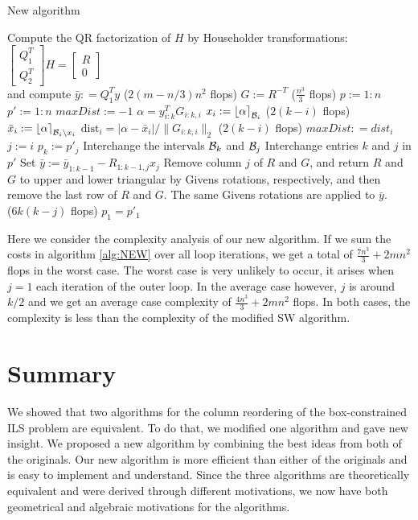 \documentclass[conference]{IEEEtran}
\newcommand{\bsmx}{\left[\begin{smallmatrix}}
\newcommand{\esmx}{\end{smallmatrix}\right]}
\newcommand{\dist}{\mathrm{dist}}
\begin{document}
\begin{algorithm}
\caption{New algorithm}
\label{alg:NEW}
\begin{algorithmic}[1]
\STATE  Compute the QR factorization of $H$ by Householder transformations: 
$\bsmx Q_1^T \\ Q_2^T \esmx H= \bsmx R\\ 0 \esmx$  \\
             and compute  $\bar{y} : = Q_1^Ty$ \hfill ($2(m-n/3)n^2$ flops)
\STATE $G := R^{-T}$ \hfill ($\frac{n^3}{3}$ flops)
\STATE $p := 1:n$
\STATE $p' := 1:n$
	\STATE $maxDist := -1$
	         \STATE $\alpha=y_{i:k}^TG_{i:k,i}$
	         \STATE $x_i := \left \lfloor \alpha \right \rceil_{{\cal B}_i}$ \hfill ($2(k-i)$ flops)
	         \STATE $\bar{x}_i := \left \lfloor \alpha \right \rceil_{{{\cal B}_i}\backslash x_i}$
	         \STATE $\dist_i =|\alpha-\bar{x}_i|/ \| G_{i:k,i} \|_2$ \hfill ($2(k-i)$ flops)
			 	\STATE $maxDist : = dist_i$
			 	\STATE $j:=i$
			 \ENDIF	
	\ENDFOR
	\STATE $p_k := p'_j$
	\STATE Interchange the intervals ${{\cal B}_k}$ and ${{\cal B}_j}$
	\STATE Interchange entries $k$ and $j$ in $p'$
	\STATE Set $\bar{y}:=\bar{y}_{1:k-1} - R_{1:k-1,j}x_j$	
	\STATE Remove column $j$ of $R$ and $G$, and return $R$ and $G$ to upper and lower triangular 
	by Givens rotations, respectively, and then remove the last row of $R$ and $G$. 
	The same Givens rotations are applied to $\bar{y}$. \\  \hfill ($6k(k-j)$ flops)
\ENDFOR
\STATE $p_1 = p'_1$
\end{algorithmic}
\end{algorithm}

Here we consider the complexity analysis of our new algorithm. 
If we sum the costs in algorithm \ref{alg:NEW} over all loop iterations,
we get a total of $\frac{7n^3}{3} + 2mn^2$ flops in the worst case. 
The worst case is very unlikely to occur, it arises when $j=1$ each iteration of the outer loop. In the average case
however, $j$ is around $k/2$ and we get an average case complexity of $\frac{4n^3}{3} + 2mn^2$ flops.
In both cases, the complexity is less than the complexity of the modified SW algorithm. 



\section{Summary}
We showed that two algorithms for the column reordering  of the
box-constrained ILS problem are equivalent. To do that, we modified 
one algorithm and gave new insight.  
We proposed a new algorithm by combining
 the best ideas from both of the originals. Our new algorithm is more
efficient than either of the originals and is easy to implement and understand. 
Since the
three algorithms are theoretically equivalent and were derived through different
motivations, we now have both geometrical and algebraic motivations for the
algorithms.  
\end{document}
